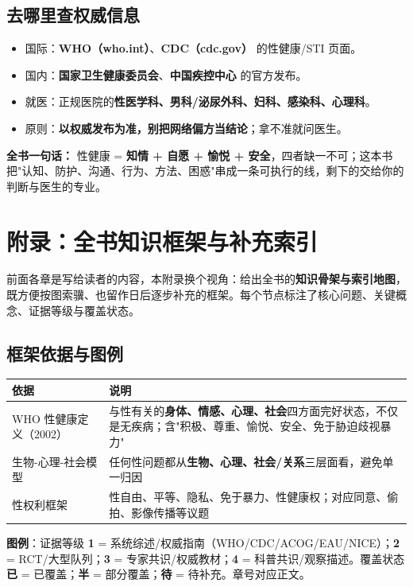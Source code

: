\documentclass[12pt,UTF8,openany]{ctexbook}
\begin{document}
\section{去哪里查权威信息}

\begin{itemize}[leftmargin=2em,itemsep=0.3em]
  \item 国际：\textbf{WHO（who.int）}、\textbf{CDC（cdc.gov）} 的性健康/STI 页面。
  \item 国内：\textbf{国家卫生健康委员会}、\textbf{中国疾控中心} 的官方发布。
  \item 就医：正规医院的\textbf{性医学科、男科/泌尿外科、妇科、感染科、心理科}。
  \item 原则：\textbf{以权威发布为准，别把网络偏方当结论}；拿不准就问医生。
\end{itemize}

\vspace{1em}
\noindent\textbf{全书一句话：} 性健康 = \textbf{知情 + 自愿 + 愉悦 + 安全}，四者缺一不可；这本书把"认知、防护、沟通、行为、方法、困惑"串成一条可执行的线，剩下的交给你的判断与医生的专业。

\chapter{附录：全书知识框架与补充索引}

前面各章是写给读者的内容，本附录换个视角：给出全书的\textbf{知识骨架与索引地图}，既方便按图索骥、也留作日后逐步补充的框架。每个节点标注了核心问题、关键概念、证据等级与覆盖状态。

\section{框架依据与图例}

\begin{tabularx}{\linewidth}{X X}
\toprule
\textbf{依据} & \textbf{说明} \\
\midrule
WHO 性健康定义（2002） & 与性有关的\textbf{身体、情感、心理、社会}四方面完好状态，不仅是无疾病；含"积极、尊重、愉悦、安全、免于胁迫歧视暴力" \\
生物-心理-社会模型 & 任何性问题都从\textbf{生物、心理、社会/关系}三层面看，避免单一归因 \\
性权利框架 & 性自由、平等、隐私、免于暴力、性健康权；对应同意、偷拍、影像传播等议题 \\
\bottomrule
\end{tabularx}

\vspace{0.5em}
\noindent\textbf{图例}：证据等级 \textbf{1} = 系统综述/权威指南（WHO/CDC/ACOG/EAU/NICE）；\textbf{2} = RCT/大型队列；\textbf{3} = 专家共识/权威教材；\textbf{4} = 科普共识/观察描述。覆盖状态 \textbf{已} = 已覆盖；\textbf{半} = 部分覆盖；\textbf{待} = 待补充。章号对应正文。
\end{document}
